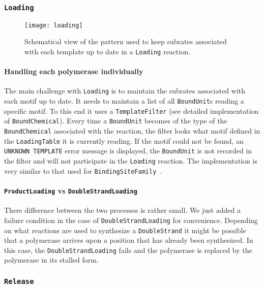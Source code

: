\subsubsection{\texttt{Loading}}

\begin{figure}[!h]
  \centering
  \texttt{[image: loading]}
  \caption{Schematical view of the pattern used to keep subrates
  associated with each template up to date in a \texttt{Loading} reaction.}
\label{fig:det_loading}
\end{figure}

\paragraph{Handling each polymerase individually}
The main challenge with \texttt{Loading} is to maintain
the subrates associated with each motif up to date.
It needs to maintain a list of all \texttt{BoundUnit}s reading a specific motif.
To this end it uses a \texttt{TemplateFilter} (see detailed implementation of \texttt{BoundChemical}).
Every time a \texttt{BoundUnit} becomes of the type of the \texttt{BoundChemical} associated with the reaction,
the filter looks what motif defined in the \texttt{LoadingTable} it is currently reading.
If the motif could not be found, an \texttt{UNKNOWN TEMPLATE} error message is displayed,
the \texttt{BoundUnit} is not recorded in the filter and will not participate in the \texttt{Loading} reaction.
The implementation is very similar to that used for \texttt{BindingSiteFamily}~.

\paragraph{\texttt{ProductLoading} vs \texttt{DoubleStrandLoading}}
There difference between the two processes is rather small.
We just added a failure condition in the case of \texttt{DoubleStrandLoading} for convenience.
Depending on what reactions are used to synthesize a \texttt{DoubleStrand}
it might be possible that a polymerase arrives upon a position that has already been synthesized.
In this case, the \texttt{DoubleStrandLoading} fails and the polymerase is replaced by the polymerase in its stalled form.


\subsubsection{\texttt{Release}}

